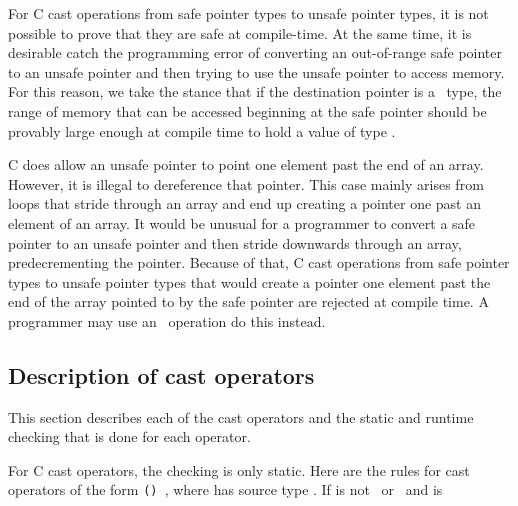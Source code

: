 For C cast operations from safe pointer types to unsafe pointer types,
it is not possible to prove that they are safe at compile-time.   At the same
time, it is desirable catch the programming error of converting an out-of-range
safe pointer to an unsafe pointer and then trying to use the unsafe
pointer to access memory.  For this reason, we take the stance that if the
destination pointer is a \unsafeptrT\ type, the range of memory that can be accessed
beginning at the safe pointer should be provably large enough at compile time 
to hold a value of type .

C does allow an unsafe pointer to point one element past the end of an array.
However, it is illegal to dereference that pointer.  This case mainly arises
from loops that stride through an array and end up creating a pointer one past
an element of an array.  It would be unusual for a programmer to
convert a safe pointer to an unsafe pointer and then stride downwards through an array, 
predecrementing the pointer.  Because of that, C cast operations from safe pointer
types to unsafe pointer types that would create a pointer one element past
the end of the array pointed to by the safe pointer are rejected at compile time.
A programmer may use an \assumeboundscast\ operation do this instead.

\subsection{Description of cast operators}

This section describes each of the cast operators and the static
and runtime checking that is done for each operator.   

For C cast operators, the checking is only static.
Here are the rules for cast operators of the form \texttt{() },
where  has source type . If
 is not \ptrvoid\ or \unsafeptrvoid\ and  is

